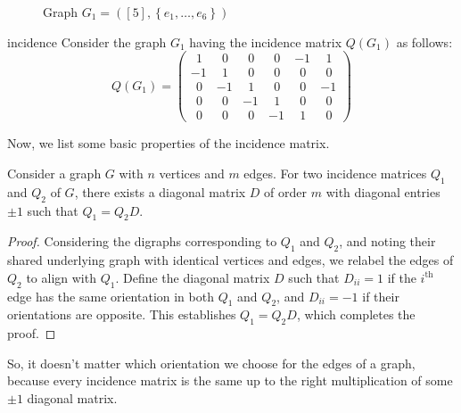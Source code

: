 \documentclass[../basic_graph_theory.tex]{subfiles}
\begin{document}
\begin{figure}[hbt]
  \centering
  \label{fig:incidence}
  \caption{Graph $G_1 = \left( [5], \left\{ e_1, \dots, e_6 \right\}  \right)$}
\end{figure}

\begin{Eg}{}{incidence}
  Consider the graph $ G_1 $ having the incidence matrix $ Q(G_1) $ as follows:
  \[
    Q(G_1) = \begin{pmatrix}
      \ \ 1 & \ \ 0 & \ \ 0 & \ \ 0 & -1    & \ \ 1 \\
      -1    & \ \ 1 & \ \ 0 & \ \ 0 & \ \ 0 & \ \ 0 \\
      \ \ 0 & -1    & \ \ 1 & \ \ 0 & \ \ 0 & -1    \\
      \ \ 0 & \ \ 0 & -1    & \ \ 1 & \ \ 0 & \ \ 0 \\
      \ \ 0 & \ \ 0 & \ \ 0 & -1    & \ \ 1 & \ \ 0
    \end{pmatrix}
  \]
\end{Eg}

Now, we list some basic properties of the incidence matrix.
\begin{Thm}{}{}
  Consider a graph $G$ with $n$ vertices and $m$ edges. For two incidence matrices $ Q_1 $ and $ Q_2 $ of $ G $, there exists a diagonal matrix $ D $ of order \(m\) with diagonal entries \(\pm 1\) such that $ Q_1 = Q_2 D $.
\end{Thm}
\begin{proof}
  Considering the digraphs corresponding to \(Q_1\) and \(Q_2\), and noting their shared underlying graph with identical vertices and edges, we relabel the edges of \(Q_2\) to align with \(Q_1\). Define the diagonal matrix \(D\) such that \(D_{ii} = 1\) if the \(i^{\text{th}}\) edge has the same orientation in both \(Q_1\) and \(Q_2\), and \(D_{ii} = -1\) if their orientations are opposite. This establishes \(Q_1 = Q_2 D\), which completes the proof.
\end{proof}

So, it doesn't matter which orientation we choose for the edges of a graph, because every incidence matrix is the same up to the right multiplication of some \(\pm 1\) diagonal matrix.
\end{document}
